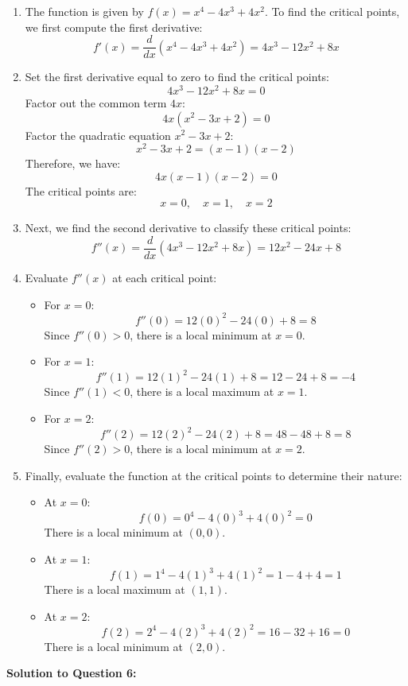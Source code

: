\documentclass{article}
\begin{document}
\begin{enumerate}[label=(\alph*), itemsep=10pt]
    \item The function is given by \( f(x) = x^4 - 4x^3 + 4x^2 \). To find the critical points, we first compute the first derivative:
    \[
    f'(x) = \frac{d}{dx}(x^4 - 4x^3 + 4x^2) = 4x^3 - 12x^2 + 8x
    \]

    \item Set the first derivative equal to zero to find the critical points:
    \[
    4x^3 - 12x^2 + 8x = 0
    \]
    Factor out the common term \( 4x \):
    \[
    4x(x^2 - 3x + 2) = 0
    \]
    Factor the quadratic equation \( x^2 - 3x + 2 \):
    \[
    x^2 - 3x + 2 = (x - 1)(x - 2)
    \]
    Therefore, we have:
    \[
    4x(x - 1)(x - 2) = 0
    \]
    The critical points are:
    \[
    x = 0, \quad x = 1, \quad x = 2
    \]

    \item Next, we find the second derivative to classify these critical points:
    \[
    f''(x) = \frac{d}{dx}(4x^3 - 12x^2 + 8x) = 12x^2 - 24x + 8
    \]

    \item Evaluate \( f''(x) \) at each critical point:
    \begin{itemize}
        \item For \( x = 0 \):
        \[
        f''(0) = 12(0)^2 - 24(0) + 8 = 8
        \]
        Since \( f''(0) > 0 \), there is a local minimum at \( x = 0 \).

        \item For \( x = 1 \):
        \[
        f''(1) = 12(1)^2 - 24(1) + 8 = 12 - 24 + 8 = -4
        \]
        Since \( f''(1) < 0 \), there is a local maximum at \( x = 1 \).

        \item For \( x = 2 \):
        \[
        f''(2) = 12(2)^2 - 24(2) + 8 = 48 - 48 + 8 = 8
        \]
        Since \( f''(2) > 0 \), there is a local minimum at \( x = 2 \).
    \end{itemize}

    \item Finally, evaluate the function at the critical points to determine their nature:
    \begin{itemize}
        \item At \( x = 0 \):
        \[
        f(0) = 0^4 - 4(0)^3 + 4(0)^2 = 0
        \]
        There is a local minimum at \( (0, 0) \).

        \item At \( x = 1 \):
        \[
        f(1) = 1^4 - 4(1)^3 + 4(1)^2 = 1 - 4 + 4 = 1
        \]
        There is a local maximum at \( (1, 1) \).

        \item At \( x = 2 \):
        \[
        f(2) = 2^4 - 4(2)^3 + 4(2)^2 = 16 - 32 + 16 = 0
        \]
        There is a local minimum at \( (2, 0) \).
    \end{itemize}
\end{enumerate}
    \item \textbf{Solution to Question 6:}
\end{document}
